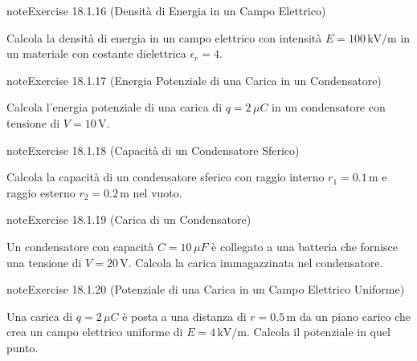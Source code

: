 \documentclass[letterpaper,10pt,italian]{jupyterBook}
\begin{document}
\begin{sphinxadmonition}{note}{Exercise 18.1.16 (Densità di Energia in un Campo Elettrico)}



\sphinxAtStartPar
Calcola la densità di energia in un campo elettrico con intensità \(E = 100 \, \text{kV/m}\) in un materiale con costante dielettrica \(\epsilon_r = 4\).
\end{sphinxadmonition}
 \label{exercise:ch/electromagnetism/electrostatics-problems-exercise-16}

\begin{sphinxadmonition}{note}{Exercise 18.1.17 (Energia Potenziale di una Carica in un Condensatore)}



\sphinxAtStartPar
Calcola l’energia potenziale di una carica di \(q = 2 \, \mu C\) in un condensatore con tensione di \(V = 10 \, \text{V}\).
\end{sphinxadmonition}
 \label{exercise:ch/electromagnetism/electrostatics-problems-exercise-17}

\begin{sphinxadmonition}{note}{Exercise 18.1.18 (Capacità di un Condensatore Sferico)}



\sphinxAtStartPar
Calcola la capacità di un condensatore sferico con raggio interno \(r_1 = 0.1 \, \text{m}\) e raggio esterno \(r_2 = 0.2 \, \text{m}\) nel vuoto.
\end{sphinxadmonition}
 \label{exercise:ch/electromagnetism/electrostatics-problems-exercise-18}

\begin{sphinxadmonition}{note}{Exercise 18.1.19 (Carica di un Condensatore)}



\sphinxAtStartPar
Un condensatore con capacità \(C = 10 \, \mu F\) è collegato a una batteria che fornisce una tensione di \(V = 20 \, \text{V}\). Calcola la carica immagazzinata nel condensatore.
\end{sphinxadmonition}
 \label{exercise:ch/electromagnetism/electrostatics-problems-exercise-19}

\begin{sphinxadmonition}{note}{Exercise 18.1.20 (Potenziale di una Carica in un Campo Elettrico Uniforme)}



\sphinxAtStartPar
Una carica di \(q = 2 \, \mu C\) è posta a una distanza di \(r = 0.5 \, \text{m}\) da un piano carico che crea un campo elettrico uniforme di \(E = 4 \, \text{kV/m}\). Calcola il potenziale in quel punto.
\end{sphinxadmonition}
 \label{exercise:ch/electromagnetism/electrostatics-problems-exercise-20}
\end{document}
